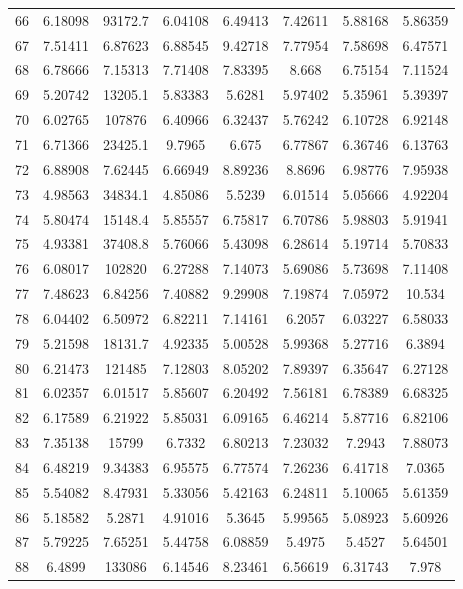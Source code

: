 \begin{figure}
\begin{tabular}{cccccccc}
66 & 6.18098 & 93172.7 & 6.04108 & 6.49413 & 7.42611 & 5.88168 & 5.86359\\
67 & 7.51411 & 6.87623 & 6.88545 & 9.42718 & 7.77954 & 7.58698 & 6.47571\\
68 & 6.78666 & 7.15313 & 7.71408 & 7.83395 & 8.668 & 6.75154 & 7.11524\\
69 & 5.20742 & 13205.1 & 5.83383 & 5.6281 & 5.97402 & 5.35961 & 5.39397\\
70 & 6.02765 & 107876 & 6.40966 & 6.32437 & 5.76242 & 6.10728 & 6.92148\\
71 & 6.71366 & 23425.1 & 9.7965 & 6.675 & 6.77867 & 6.36746 & 6.13763\\
72 & 6.88908 & 7.62445 & 6.66949 & 8.89236 & 8.8696 & 6.98776 & 7.95938\\
73 & 4.98563 & 34834.1 & 4.85086 & 5.5239 & 6.01514 & 5.05666 & 4.92204\\
74 & 5.80474 & 15148.4 & 5.85557 & 6.75817 & 6.70786 & 5.98803 & 5.91941\\
75 & 4.93381 & 37408.8 & 5.76066 & 5.43098 & 6.28614 & 5.19714 & 5.70833\\
76 & 6.08017 & 102820 & 6.27288 & 7.14073 & 5.69086 & 5.73698 & 7.11408\\
77 & 7.48623 & 6.84256 & 7.40882 & 9.29908 & 7.19874 & 7.05972 & 10.534\\
78 & 6.04402 & 6.50972 & 6.82211 & 7.14161 & 6.2057 & 6.03227 & 6.58033\\
79 & 5.21598 & 18131.7 & 4.92335 & 5.00528 & 5.99368 & 5.27716 & 6.3894\\
80 & 6.21473 & 121485 & 7.12803 & 8.05202 & 7.89397 & 6.35647 & 6.27128\\
81 & 6.02357 & 6.01517 & 5.85607 & 6.20492 & 7.56181 & 6.78389 & 6.68325\\
82 & 6.17589 & 6.21922 & 5.85031 & 6.09165 & 6.46214 & 5.87716 & 6.82106\\
83 & 7.35138 & 15799 & 6.7332 & 6.80213 & 7.23032 & 7.2943 & 7.88073\\
84 & 6.48219 & 9.34383 & 6.95575 & 6.77574 & 7.26236 & 6.41718 & 7.0365\\
85 & 5.54082 & 8.47931 & 5.33056 & 5.42163 & 6.24811 & 5.10065 & 5.61359\\
86 & 5.18582 & 5.2871 & 4.91016 & 5.3645 & 5.99565 & 5.08923 & 5.60926\\
87 & 5.79225 & 7.65251 & 5.44758 & 6.08859 & 5.4975 & 5.4527 & 5.64501\\
88 & 6.4899 & 133086 & 6.14546 & 8.23461 & 6.56619 & 6.31743 & 7.978\\

\end{tabular}
\end{figure}
